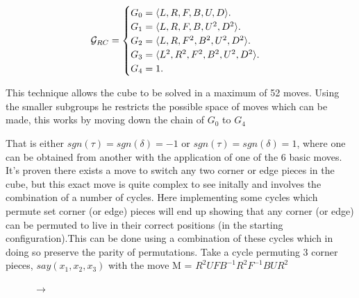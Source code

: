 \documentclass{article}
\DeclarePairedDelimiter{\opair}{\langle}{\rangle}
\begin{document}
\begin{equation}
  \mathcal{G}_{RC}=\begin{cases}
    G_{0} = \text{$\opair{L,R,F,B,U,D}$}.\\
    G_{1} = \text{$\opair{L,R,F,B,U^{2},D^{2}}$}.\\
    G_{2} = \text{$\opair{L,R,F^{2},B^{2},U^{2},D^{2}}$}.\\
    G_{3} = \text{$\opair{L^{2},R^{2},F^{2},B^{2},U^{2},D^{2}}$}.\\
    G_{4} = \text{1}.
  \end{cases}
\end{equation}

This technique allows the cube to be solved in a maximum of 52 moves. Using the smaller subgroups he restricts the possible space of moves which can be made, this works by moving down the chain of $G_{0}$ to $G_{4}$

\newpage
 That is either $sgn(\tau) = sgn(\delta) = -1$ or $sgn(\tau) = sgn(\delta) = 1$, where one can be obtained from another with the application of one of the 6 basic moves. 
It's proven there exists a move to switch any two corner or edge pieces in the cube, but this exact move is quite complex to see initally and involves the combination of a number of cycles.
Here implementing some cycles which permute set corner (or edge) pieces will end up showing that any corner (or edge) can be permuted to live in their correct positions (in the starting configuration).This can be done using a combination of these cycles which in doing so preserve the parity of permutations. Take a cycle permuting 3 corner pieces, $say (x_1,x_2,x_3)$ with the move M = $R^{2}UFB^{-1}R^{2}F^{-1}BUR^{2}$

\newcommand{\threecycle}{[Corner 3 Cycle], R2,U,F,Bp,R2,Fp,B,U,R2}
\newcommand{\CubeUpSideDown}{\RubikCubeSolved\RubikRotation{x2,y}}
\begin{figure}[h]
\RubikCubeSolvedWY%
%
\quad{}%
\RubikRotation{\threecycle}%
\quad\SequenceBraceA{\SequenceName}{\ShowSequence{}{\Rubik}{\SequenceLong}}
\quad$\longrightarrow$\quad
{}%
\end{figure}
\end{document}
